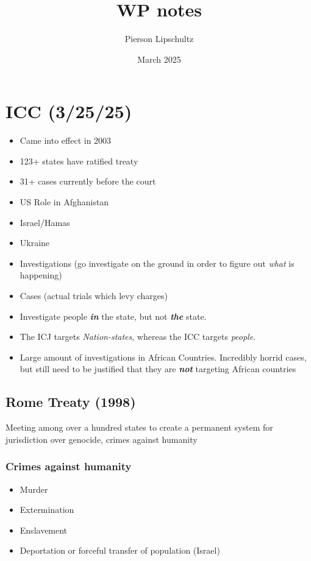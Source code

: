 \documentclass{article}
\title{WP notes}
\author{Pierson Lipschultz}
\date{March 2025}
\begin{document}
        
\section{ICC (3/25/25)}

\begin{itemize}
    \item Came into effect in 2003
    \item 123+ states have ratified treaty
    \item 31+ cases currently before the court
    \item US Role in Afghanistan
    \item Israel/Hamas
    \item Ukraine 
\end{itemize}
\begin{itemize}
    \item Investigations (go investigate on the ground in order to figure out \textit{what} is happening)
    \item Cases (actual trials which levy charges)
    \item Investigate people \textit{\textbf{in}} the state, but not \textit{\textbf{the}} state.
    \item The ICJ targets \textit{Nation-states}, whereas the ICC targets \textit{people}.
    \item Large amount of investigations in African Countries. Incredibly horrid cases, but still need to be justified that they are \textit{\textbf{not}} targeting African countries
\end{itemize}


\subsection{Rome Treaty (1998)}
Meeting among over a hundred states to create a permanent system for jurisdiction over genocide, crimes against humanity

\subsubsection{Crimes against humanity}
\begin{itemize}
    \item Murder
    \item Extermination
    \item Enslavement
    \item Deportation or forceful transfer of population (Israel)
\end{itemize}
\end{document}
